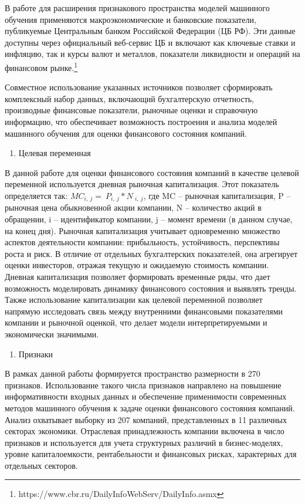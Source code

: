 \documentclass[
]{article}
\begin{document}
В работе для расширения признакового пространства моделей машинного обучения применяются макроэкономические и банковские показатели, публикуемые Центральным банком Российской Федерации (ЦБ РФ). Эти данные доступны через официальный веб-сервис ЦБ и включают как ключевые ставки и инфляцию, так и курсы валют и металлов, показатели ликвидности и операций на финансовом рынке.\footnote{https://www.cbr.ru/DailyInfoWebServ/DailyInfo.asmx}

Совместное использование указанных источников позволяет сформировать комплексный набор данных, включающий бухгалтерскую отчетность, производные финансовые показатели, рыночные оценки и справочную информацию, что обеспечивает возможность построения и анализа моделей машинного обучения для оценки финансового состояния компаний.

\begin{enumerate}
\def\labelenumi{\alph{enumi}.}
\setcounter{enumi}{1}
\item
  Целевая переменная
\end{enumerate}

В данной работе для оценки финансового состояния компаний в качестве целевой переменной используется дневная рыночная капитализация. Этот показатель определяется так: \({MC}_{i,\ j} = \ P_{i,\ j}*{N\ }_{i,\ j}\), где MC -- рыночная капитализация, P -- рыночная цена обыкновенной акции компании, N -- количество акций в обращении, i -- идентификатор компании, j -- момент времени (в данном случае, на конец дня). Рыночная капитализация учитывает одновременно множество аспектов деятельности компании: прибыльность, устойчивость, перспективы роста и риск. В отличие от отдельных бухгалтерских показателей, она агрегирует оценки инвесторов, отражая текущую и ожидаемую стоимость компании. Дневная капитализация позволяет формировать временные ряды, что дает возможность моделировать динамику финансового состояния и выявлять тренды. Также использование капитализации как целевой переменной позволяет напрямую исследовать связь между внутренними финансовыми показателями компании и рыночной оценкой, что делает модели интерпретируемыми и экономически значимыми.

\begin{enumerate}
\def\labelenumi{\alph{enumi}.}
\setcounter{enumi}{2}
\item
  Признаки
\end{enumerate}

В рамках данной работы формируется пространство размерности в 270 признаков. Использование такого числа признаков направлено на повышение информативности входных данных и обеспечение применимости современных методов машинного обучения к задаче оценки финансового состояния компаний. Анализ охватывает выборку из 207 компаний, представленных в 11 различных секторах экономики. Отраслевая принадлежность компании включена в число признаков и используется для учета структурных различий в бизнес-моделях, уровне капиталоемкости, рентабельности и финансовых рисках, характерных для отдельных секторов.
\end{document}
